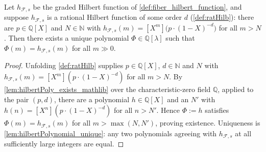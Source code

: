 \begin{lemma}\leanok
  \label{lem:hilbertPoly_of_isRatHilb}
  Let \(h_{\mathcal{F},s}\) be the graded Hilbert function of
  \cref{def:fiber_hilbert_function}, and suppose \(h_{\mathcal{F},s}\) is a
  rational Hilbert function of some order \(d\) (\cref{def:ratHilb}): there
  are \(p \in \mathbb{Q}[X]\) and \(N \in \mathbb{N}\) with
  \(h_{\mathcal{F},s}(m) = [X^m]\bigl(p \cdot (1-X)^{-d}\bigr)\) for all
  \(m > N\). Then there exists a unique polynomial
  \(\Phi \in \mathbb{Q}[\lambda]\) such that
  \(\Phi(m) = h_{\mathcal{F},s}(m)\) for all \(m \gg 0\).
\end{lemma}

\begin{proof}
  \leanok
  Unfolding \cref{def:ratHilb} supplies \(p \in \mathbb{Q}[X]\),
  \(d \in \mathbb{N}\) and \(N\) with
  \(h_{\mathcal{F},s}(m) = [X^m](p\cdot(1-X)^{-d})\) for all \(m > N\). By
  \cref{lem:hilbertPoly_exists_mathlib} over the characteristic-zero field
  \(\mathbb{Q}\), applied to the pair \((p, d)\), there are a polynomial
  \(h \in \mathbb{Q}[X]\) and an \(N'\) with
  \(h(n) = [X^n](p\cdot(1-X)^{-d})\) for all \(n > N'\). Hence
  \(\Phi := h\) satisfies \(\Phi(m) = h_{\mathcal{F},s}(m)\) for all
  \(m > \max(N, N')\), proving existence. Uniqueness is
  \cref{lem:hilbertPolynomial_unique}: any two polynomials agreeing with
  \(h_{\mathcal{F},s}\) at all sufficiently large integers are equal.
\end{proof}

